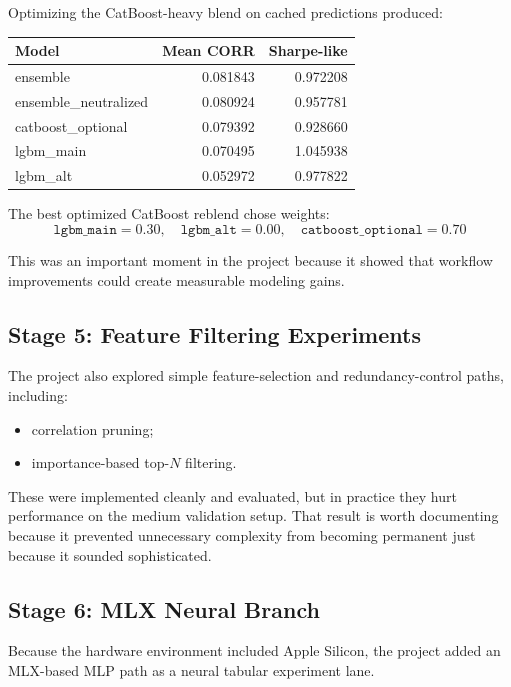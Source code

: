 \documentclass[11pt]{article}
\begin{document}
Optimizing the CatBoost-heavy blend on cached predictions produced:

\begin{center}
\begin{tabular}{lrr}
\toprule
Model & Mean CORR & Sharpe-like \\
\midrule
ensemble & 0.081843 & 0.972208 \\
ensemble\_neutralized & 0.080924 & 0.957781 \\
catboost\_optional & 0.079392 & 0.928660 \\
lgbm\_main & 0.070495 & 1.045938 \\
lgbm\_alt & 0.052972 & 0.977822 \\
\bottomrule
\end{tabular}
\end{center}

The best optimized CatBoost reblend chose weights:
\[
\texttt{lgbm\_main} = 0.30, \quad
\texttt{lgbm\_alt} = 0.00, \quad
\texttt{catboost\_optional} = 0.70
\]

This was an important moment in the project because it showed that workflow improvements could create measurable modeling gains.

\subsection{Stage 5: Feature Filtering Experiments}

The project also explored simple feature-selection and redundancy-control paths, including:

\begin{itemize}[leftmargin=1.5em]
  \item correlation pruning;
  \item importance-based top-\(N\) filtering.
\end{itemize}

These were implemented cleanly and evaluated, but in practice they hurt performance on the medium validation setup. That result is worth documenting because it prevented unnecessary complexity from becoming permanent just because it sounded sophisticated.

\subsection{Stage 6: MLX Neural Branch}

Because the hardware environment included Apple Silicon, the project added an MLX-based MLP path as a neural tabular experiment lane.
\end{document}
